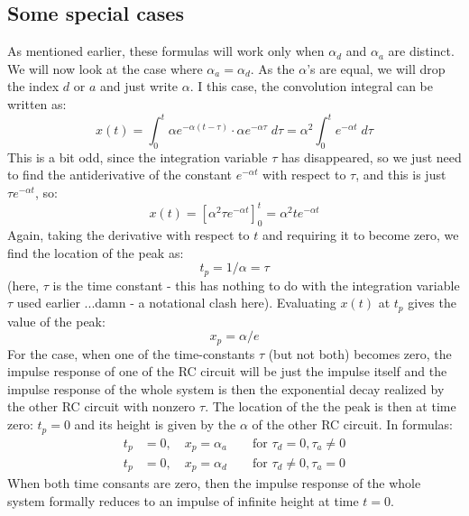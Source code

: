 \subsection{Some special cases}
As mentioned earlier, these formulas will work only when $\alpha_d$ and $\alpha_a$ are distinct. We will now look at the case where $\alpha_a = \alpha_d$. As the $\alpha$'s are equal, we will drop the index $d$ or $a$ and just write $\alpha$. I this case, the convolution integral can be written as:
\begin{equation}
 x(t) = \int_0^t \alpha e^{ -\alpha (t-\tau) } \cdot \alpha e^{ -\alpha \tau } \; d \tau
      = \alpha^2 \int_0^t e^{ -\alpha t } \; d \tau      
\end{equation}
This is a bit odd, since the integration variable $\tau$ has disappeared, so we just need to find the antiderivative of the constant $e^{ -\alpha t }$ with respect to $\tau$, and this is just $\tau e^{ -\alpha t }$, so:
\begin{equation}
 x(t) = \left[ \alpha^2 \tau e^{ -\alpha t } \right]_0^t =  \alpha^2 t e^{ -\alpha t }
\end{equation}
Again, taking the derivative with respect to $t$ and requiring it to become zero, we find the location of the peak as:
\begin{equation}
\boxed
{
 t_p = 1 / \alpha = \tau
}
\end{equation}
(here, $\tau$ is the time constant - this has nothing to do with the integration variable $\tau$ used earlier ...damn - a notational clash here). Evaluating $x(t)$ at $t_p$ gives the value of the peak:
\begin{equation}
\boxed
{
 x_p = \alpha / e
}
\end{equation}
For the case, when one of the time-constants $\tau$ (but not both) becomes zero, the impulse response of one of the RC circuit will be just the impulse itself and the impulse response of the whole system is then the exponential decay realized by the other RC circuit with nonzero $\tau$. The location of the the peak is then at time zero: $t_p = 0$ and its height is given by the $\alpha$ of the other RC circuit. In formulas:
\begin{equation}
\boxed
{
\begin{aligned}
 t_p &= 0, \quad x_p = \alpha_a  \qquad \text{for } \tau_d   =  0, \tau_a \neq 0 \\
 t_p &= 0, \quad x_p = \alpha_d  \qquad \text{for } \tau_d \neq 0, \tau_a   =  0 
\end{aligned}
}
\end{equation}
When both time consants are zero, then the impulse response of the whole system formally reduces to an impulse of infinite height at time $t=0$.

